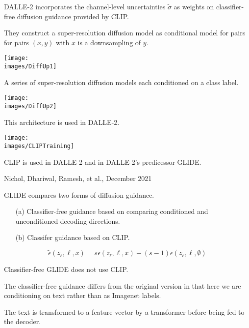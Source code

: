 {\vfill
DALLE-2 incorporates the channel-level uncertainties $\tilde{\sigma}$ as weights on classifier-free diffusion guidance provided by CLIP.


They construct a super-resolution diffusion model as conditional model for pairs for pairs $(x,y)$ with $x$ is a downsampling of $y$.

\vfill
\centerline{\texttt{[image: \\images/DiffUp1]}}


A series of super-resolution diffusion models each conditioned on a class label.

\centerline{\texttt{[image: \\images/DiffUp2]}}

\vfill
This architecture is used in DALLE-2.


\centerline{\texttt{[image: \\images/CLIPTraining]}}

\vfill
CLIP is used in DALLE-2 and in DALLE-2's predicessor GLIDE.

         {Nichol, Dhariwal, Ramesh, et al., December 2021}

GLIDE compares two forms of diffusion guidance.

\vfill
\begin{itemize}
\item[(a)] Classifier-free guidance based on comparing conditioned and unconditioned decoding directions.

\vfill
\item[(b)] Classifer guidance based on CLIP.
\end{itemize}


$$\tilde{\epsilon}(z_\ell,\ell,x) = s\epsilon(z_\ell,\ell,x) - (s-1)\epsilon(z_\ell,\ell,\emptyset)$$

\vfill
Classifier-free GLIDE does not use CLIP.

\vfill
The classifier-free guidance differs from the original version in that here we are conditioning on text
rather than as Imagenet labels.

\vfill
The text is transformed to a feature vector by a transformer before being fed to the decoder.

}
